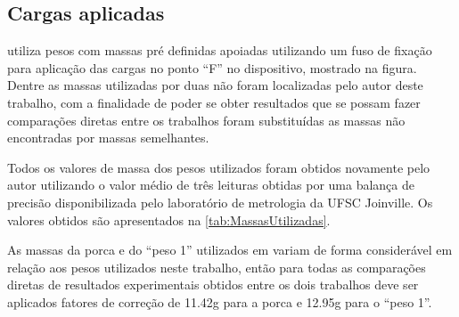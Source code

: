\subsection{Cargas aplicadas}

\autocite{Minela2017} utiliza pesos com massas pré definidas apoiadas utilizando um fuso de fixação para aplicação das cargas no ponto “F” no dispositivo, mostrado na figura.
Dentre as massas utilizadas por \autocite{Minela2017} duas não foram localizadas pelo autor deste trabalho, com a finalidade de poder se obter resultados que se possam fazer
comparações diretas entre os trabalhos foram substituídas as massas não encontradas por massas semelhantes.

Todos os valores de massa dos pesos utilizados foram obtidos novamente pelo autor utilizando o valor médio de três leituras obtidas por uma balança de precisão disponibilizada pelo laboratório de metrologia
da UFSC Joinville. Os valores obtidos são apresentados na \autoref{tab:MassasUtilizadas}.

\begin{table}[!ht]
    \caption{Valores de massas utilizadas para aplicação das cargas nos dispositivos de flexão e torção}
    \label{tab:MassasUtilizadas}
    \centering
\end{table}

As massas da porca e do “peso 1” utilizados em \autocite{Minela2017} variam de forma considerável em relação aos pesos utilizados neste trabalho, então para todas as comparações diretas de
resultados experimentais obtidos entre os dois trabalhos deve ser aplicados fatores de correção de 11.42g para a porca e 12.95g para o “peso 1”.

